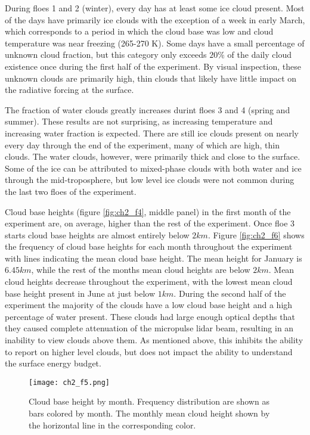 During floes 1 and 2 (winter), every day has at least some ice cloud present. Most of the days have primarily ice clouds with the exception of a week in early March, which corresponds to a period in which the cloud base was low and cloud temperature was near freezing (265-270 K). Some days have a small percentage of unknown cloud fraction, but this category only exceeds $20 \%$ of the daily cloud existence once during the first half of the experiment. By visual inspection, these unknown clouds are primarily high, thin clouds that likely have little impact on the radiative forcing at the surface.

The fraction of water clouds greatly increases durint floes 3 and 4 (spring and summer). These results are not surprising, as increasing temperature and increasing water fraction is expected. There are still ice clouds present on nearly every day through the end of the experiment, many of which are high, thin clouds. The water clouds, however, were primarily thick and close to the surface. Some of the ice can be attributed to mixed-phase clouds with both water and ice through the mid-troposphere, but low level ice clouds were not common during the last two floes of the experiment.

Cloud base heights (figure \ref{fig:ch2_f4}, middle panel) in the first month of the experiment are, on average, higher than the rest of the experiment. Once floe 3 starts cloud base heights are almost entirely below $2 km$. Figure \ref{fig:ch2_f6} shows the frequency of cloud base heights for each month throughout the experiment with lines indicating the mean cloud base height. The mean height for January is $6.45 km$, while the rest of the months mean cloud heights are below $2 km$. Mean cloud heights decrease throughout the experiment, with the lowest mean cloud base height present in June at just below $1 km$. During the second half of the experiment the majority of the clouds have a low cloud base height and a high percentage of water present. These clouds had large enough optical depths that they caused complete attenuation of the micropulse lidar beam, resulting in an inability to view clouds above them. As mentioned above, this inhibits the ability to report on higher level clouds, but does not impact the ability to understand the surface energy budget.

\begin{figure}[H]
    \centering
    \texttt{[image: ch2\_f5.png]}
    \caption[Cloud base height by month.]{Cloud base height by month. Frequency distribution are shown as bars colored by month. The monthly mean cloud height shown by the horizontal line in the corresponding color.}
    \label{fig:ch2_f5}
\end{figure}

